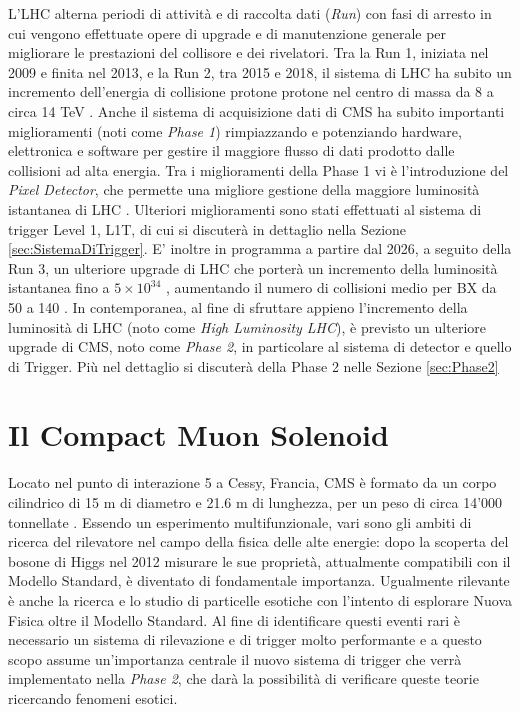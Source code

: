 L'LHC alterna periodi di attività e di raccolta dati (\textit{Run}) con fasi di arresto in cui vengono effettuate opere di upgrade e di manutenzione generale per migliorare le prestazioni del collisore e dei rivelatori. Tra la Run 1, iniziata nel 2009 e finita nel 2013, e la Run 2, tra 2015 e 2018, il sistema di LHC ha subito un incremento dell'energia di collisione protone protone nel centro di massa da 8 a circa 14 TeV \cite{sirunyan2020performance}. Anche il sistema di acquisizione dati di CMS ha subito importanti miglioramenti (noti come \textit{Phase 1}) rimpiazzando e potenziando hardware, elettronica e software per gestire il maggiore flusso di dati prodotto dalle collisioni ad alta energia. Tra i miglioramenti della Phase 1 vi è l'introduzione del \textit{Pixel Detector}, che permette una migliore gestione della maggiore luminosità istantanea di LHC \cite{Adam:2748381}. Ulteriori miglioramenti sono stati effettuati al sistema di trigger Level 1, L1T, di cui si discuterà in dettaglio nella Sezione \ref{sec:SistemaDiTrigger}. \newline
E' inoltre in programma a partire dal 2026, a seguito della Run 3, un ulteriore upgrade di LHC che porterà un incremento della luminosità istantanea fino a $5\times 10^{34}$ \Lumi, aumentando il numero di collisioni medio per BX da 50 a 140 \cite{collaboration2021phase}. In contemporanea, al fine di sfruttare appieno l'incremento della luminosità di LHC (noto come \textit{High Luminosity LHC}), è previsto un ulteriore upgrade di CMS, noto come \textit{Phase 2}, in particolare al sistema di detector e quello di Trigger. Più nel dettaglio si discuterà della Phase 2 nelle Sezione \ref{sec:Phase2}

\section{Il Compact Muon Solenoid}  
\label{sec:CMSDescrizione}

Locato nel punto di interazione 5 a Cessy, Francia, CMS è formato da un corpo cilindrico di 15 m di diametro e 21.6 m di lunghezza, per un peso di circa 14'000 tonnellate \cite{cms2008cms}. Essendo un esperimento multifunzionale, vari sono gli ambiti di ricerca del rilevatore nel campo della fisica delle alte energie: dopo la scoperta del bosone di Higgs nel 2012 misurare le sue proprietà, attualmente compatibili con il Modello Standard, è diventato di fondamentale importanza. Ugualmente rilevante è anche la ricerca e lo studio di particelle esotiche con l'intento di esplorare Nuova Fisica oltre il Modello Standard. Al fine di identificare questi eventi rari è necessario un sistema di rilevazione e di trigger molto performante \cite{sirunyan2020performance} e a questo scopo assume un'importanza centrale il nuovo sistema di trigger che verrà implementato nella \textit{Phase 2}, che darà la possibilità di verificare queste teorie ricercando fenomeni esotici.

